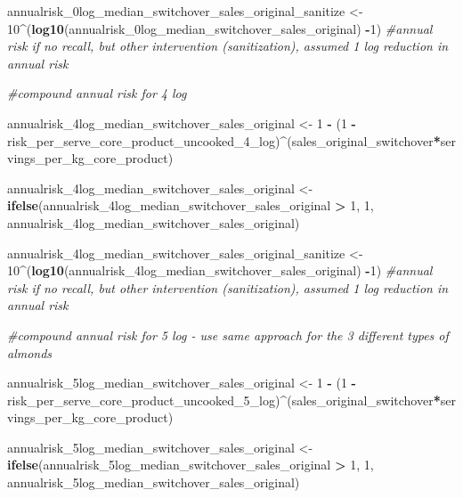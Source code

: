 \documentclass[
]{article}
\newenvironment{Shaded}{\begin{snugshade}}{\end{snugshade}}
\newcommand{\CommentTok}[1]{\textcolor[rgb]{0.56,0.35,0.01}{\textit{#1}}}
\newcommand{\DecValTok}[1]{\textcolor[rgb]{0.00,0.00,0.81}{#1}}
\newcommand{\FunctionTok}[1]{\textcolor[rgb]{0.13,0.29,0.53}{\textbf{#1}}}
\newcommand{\NormalTok}[1]{#1}
\newcommand{\OtherTok}[1]{\textcolor[rgb]{0.56,0.35,0.01}{#1}}
\newcommand{\SpecialCharTok}[1]{\textcolor[rgb]{0.81,0.36,0.00}{\textbf{#1}}}
\begin{document}
\begin{Shaded}
\begin{Highlighting}[]
\NormalTok{annualrisk\_0log\_median\_switchover\_sales\_original\_sanitize }\OtherTok{\textless{}{-}} \DecValTok{10}\SpecialCharTok{\^{}}\NormalTok{(}\FunctionTok{log10}\NormalTok{(annualrisk\_0log\_median\_switchover\_sales\_original) }\SpecialCharTok{{-}}\DecValTok{1}\NormalTok{) }\CommentTok{\#annual risk if no recall, but other intervention (sanitization), assumed 1 log reduction in annual risk}

\CommentTok{\#compound annual risk for 4 log}

\NormalTok{annualrisk\_4log\_median\_switchover\_sales\_original }\OtherTok{\textless{}{-}} \DecValTok{1} \SpecialCharTok{{-}}\NormalTok{ (}\DecValTok{1} \SpecialCharTok{{-}}\NormalTok{ risk\_per\_serve\_core\_product\_uncooked\_4\_log)}\SpecialCharTok{\^{}}\NormalTok{(sales\_original\_switchover}\SpecialCharTok{*}\NormalTok{servings\_per\_kg\_core\_product)}

\NormalTok{annualrisk\_4log\_median\_switchover\_sales\_original }\OtherTok{\textless{}{-}} \FunctionTok{ifelse}\NormalTok{(annualrisk\_4log\_median\_switchover\_sales\_original }\SpecialCharTok{\textgreater{}} \DecValTok{1}\NormalTok{, }\DecValTok{1}\NormalTok{, annualrisk\_4log\_median\_switchover\_sales\_original)}

\NormalTok{annualrisk\_4log\_median\_switchover\_sales\_original\_sanitize }\OtherTok{\textless{}{-}} \DecValTok{10}\SpecialCharTok{\^{}}\NormalTok{(}\FunctionTok{log10}\NormalTok{(annualrisk\_4log\_median\_switchover\_sales\_original) }\SpecialCharTok{{-}}\DecValTok{1}\NormalTok{) }\CommentTok{\#annual risk if no recall, but other intervention (sanitization), assumed 1 log reduction in annual risk}

\CommentTok{\#compound annual risk for 5 log {-} use same approach for the 3 different types of almonds}

\NormalTok{annualrisk\_5log\_median\_switchover\_sales\_original }\OtherTok{\textless{}{-}} \DecValTok{1} \SpecialCharTok{{-}}\NormalTok{ (}\DecValTok{1} \SpecialCharTok{{-}}\NormalTok{ risk\_per\_serve\_core\_product\_uncooked\_5\_log)}\SpecialCharTok{\^{}}\NormalTok{(sales\_original\_switchover}\SpecialCharTok{*}\NormalTok{servings\_per\_kg\_core\_product)}

\NormalTok{annualrisk\_5log\_median\_switchover\_sales\_original }\OtherTok{\textless{}{-}} \FunctionTok{ifelse}\NormalTok{(annualrisk\_5log\_median\_switchover\_sales\_original }\SpecialCharTok{\textgreater{}} \DecValTok{1}\NormalTok{, }\DecValTok{1}\NormalTok{, annualrisk\_5log\_median\_switchover\_sales\_original)}


\end{Highlighting}
\end{Shaded}
\end{document}
